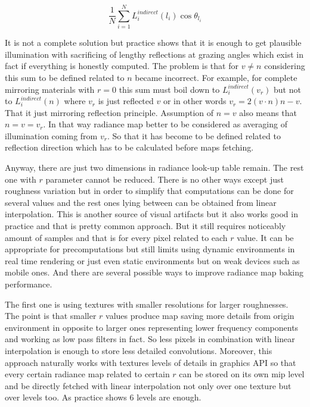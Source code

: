 \[\frac{1}{N} \sum_{i=1}^N L_i^{indirect}(l_i) \cos\theta_{l_i}\]

It is not a complete solution but practice shows that it is enough to get plausible illumination with sacrificing of lengthy reflections at grazing angles which exist in fact if everything is honestly computed. The problem is that for $v \neq n$ considering this sum to be defined related to $n$ became incorrect. For example, for complete mirroring materials with $r = 0$ this sum must boil down to $L_i^{indirect}(v_r)$ but not to $L_i^{indirect}(n)$ where $v_r$ is just reflected $v$ or in other words $v_r = 2(v \cdot n)n - v$. That it just mirroring reflection principle. Assumption of $n = v$ also means that $n = v = v_r$. In that way radiance map better to be considered as averaging of illumination coming from $v_r$. So that it has become to be defined related to reflection direction which has to be calculated before map\textquotesingle{}s fetching.

Anyway, there are just two dimensions in radiance look-\/up table remain. The rest one with $r$ parameter cannot be reduced. There is no other ways except just roughness variation but in order to simplify that computations can be done for several values and the rest ones lying between can be obtained from linear interpolation. This is another source of visual artifacts but it also works good in practice and that is pretty common approach. But it still requires noticeably amount of samples and that is for every pixel related to each $r$ value. It can be appropriate for precomputations but still limits using dynamic environments in real time rendering or just even static environments but on weak devices such as mobile ones. And there are several possible ways to improve radiance map baking performance.

The first one is using textures with smaller resolutions for larger roughnesses. The point is that smaller $r$ values produce map saving more details from origin environment in opposite to larger ones representing lower frequency components and working as low pass filters in fact. So less pixels in combination with linear interpolation is enough to store less detailed convolutions. Moreover, this approach naturally works with textures levels of details in graphics A\+PI so that every certain radiance map related to certain $r$ can be stored on its own mip level and be directly fetched with linear interpolation not only over one texture but over levels too. As practice shows 6 levels are enough.

